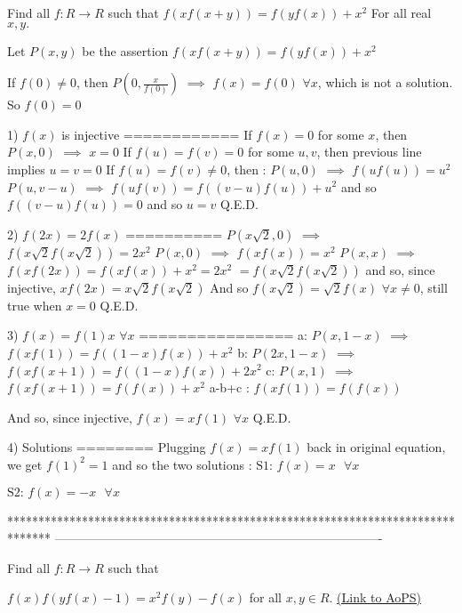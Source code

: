 \begin{solution}
	\begin{tcolorbox}Find all $f:R\rightarrow R$ such that
$f(xf(x+y)) = f(yf(x)) + x^2$ For all real $x,y.$\end{tcolorbox}
Let $P(x,y)$ be the assertion $f(xf(x+y))=f(yf(x))+x^2$

If $f(0)\ne 0$, then $P(0,\frac{x}{f(0)})$ $\implies$ $f(x)=f(0)$ $\forall x$, which is not a solution. So $f(0)=0$

1) $f(x)$ is injective
============
If $f(x)=0$ for some $x$, then $P(x,0)$ $\implies$ $x=0$
If $f(u)=f(v)=0$ for some $u,v$, then previous line implies $u=v=0$
If $f(u)=f(v)\ne 0$, then :
$P(u,0)$ $\implies$ $f(uf(u))=u^2$
$P(u,v-u)$ $\implies$ $f(uf(v))=f((v-u)f(u))+u^2$ and so $f((v-u)f(u))=0$ and so $u=v$
Q.E.D.

2) $f(2x)=2f(x)$
==========
$P(x\sqrt 2,0)$ $\implies$ $f(x\sqrt 2f(x\sqrt 2))=2x^2$
$P(x,0)$ $\implies$ $f(xf(x))=x^2$
$P(x,x)$ $\implies$ $f(xf(2x))=f(xf(x))+x^2=2x^2$ $=f(x\sqrt 2f(x\sqrt 2))$ and so, since injective, $xf(2x)=x\sqrt 2f(x\sqrt 2)$
And so $f(x\sqrt 2)=\sqrt 2f(x)$ $\forall x\ne 0$, still true when $x=0$
Q.E.D.

3) $f(x)=f(1)x$ $\forall x$ 
================
a: $P(x,1-x)$ $\implies$ $f(xf(1))=f((1-x)f(x))+x^2$
b: $P(2x,1-x)$ $\implies$ $f(xf(x+1))=f((1-x)f(x))+2x^2$
c: $P(x,1)$ $\implies$ $f(xf(x+1))=f(f(x))+x^2$
a-b+c : $f(xf(1))=f(f(x))$

And so, since injective, $f(x)=xf(1)$ $\forall x$
Q.E.D.

4) Solutions
========
Plugging $f(x)=xf(1)$ back in original equation, we get $f(1)^2=1$ and so the two solutions :
$\boxed{\text{S1: }f(x)=x\text{  }\forall x}$

$\boxed{\text{S2: }f(x)=-x\text{  }\forall x}$
\end{solution}
*******************************************************************************
-------------------------------------------------------------------------------

\begin{problem}
	Find all $f:R \rightarrow R$ such that

$f(x)f(yf(x)-1)=x^2f(y)-f(x)$ for all $x,y \in R$.
	\flushright \href{https://artofproblemsolving.com/community/c6h584016}{(Link to AoPS)}
\end{problem}



